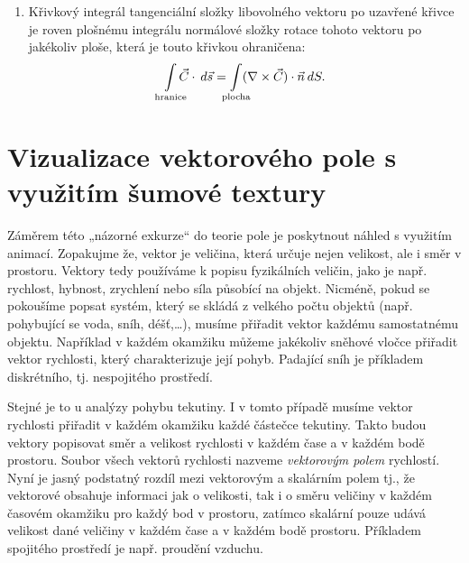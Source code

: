 {\begin{enumerate}
\begin{equation}
                         \vec{C}\cdot\vec{n}\dd{S} 
            = \limitint_{\mathclap{\substack{\text{objem}\\\text{uvnitř}\\\text{plochy}}}} 
                        (\nabla\cdot\vec{C})\dd{V}, 
            \end{equation}
      \item Křivkový integrál tangenciální složky libovolného vektoru po uzavřené křivce je roven
            plošnému integrálu normálové složky rotace tohoto vektoru po jakékoliv ploše, která je
            touto křivkou ohraničena:
            \begin{equation}
              \limitint_{\mathclap{\substack{\text{hranice}}}}  
                \vec{C}\cdot\dd{\vec{s}} =
              \limitint_{\mathclap{\substack{\text{plocha}}}}
                (\nabla\times\vec{C})\cdot\vec{n}\dd{S}.
            \end{equation}            
    \end{enumerate}
      
  \tikzexternaldisable
  \section{Vizualizace vektorového pole s využitím šumové textury}
    Záměrem této „názorné exkurze“ do teorie pole je poskytnout náhled s využitím animací. 
    Zopakujme že, vektor je veličina, která určuje nejen velikost, ale i směr v prostoru. Vektory 
    tedy používáme k popisu fyzikálních veličin, jako je např. rychlost, hybnost, zrychlení nebo 
    síla působící na objekt. Nicméně, pokud se pokoušíme popsat systém, který se skládá z velkého 
    počtu objektů (např. pohybující se voda, sníh, déšť,…), musíme přiřadit vektor každému 
    samostatnému objektu. Například v každém okamžiku můžeme jakékoliv sněhové vločce přiřadit 
    vektor rychlosti, který charakterizuje její pohyb. Padající sníh je příkladem diskrétního, tj. 
    nespojitého prostředí.    
    
    Stejné je to u analýzy pohybu tekutiny. I v tomto případě musíme vektor rychlosti přiřadit v 
    každém okamžiku každé částečce tekutiny. Takto budou vektory popisovat směr a velikost 
    rychlosti v každém čase a v každém bodě prostoru. Soubor všech vektorů rychlosti nazveme 
    \emph{vektorovým polem} rychlostí. Nyní je jasný podstatný rozdíl mezi vektorovým a skalárním 
    polem tj., že vektorové obsahuje informaci jak o velikosti, tak i o směru veličiny v každém 
    časovém okamžiku pro každý bod v prostoru, zatímco skalární pouze udává velikost dané veličiny 
    v každém čase a v každém bodě prostoru. Příkladem spojitého prostředí je např. proudění vzduchu.
    
}
